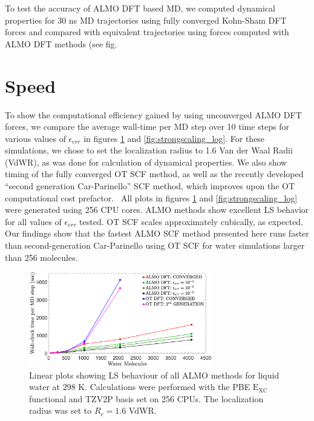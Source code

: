 \documentclass[10pt,aps,prl,twocolumn,amsmath,amssymb,superscriptaddress,longbibliography]{revtex4-1}
\begin{document}
To test the accuracy of ALMO DFT based MD, we computed dynamical properties for 30 ns MD trajectories using fully converged Kohn-Sham DFT forces and compared with equivalent trajectories using forces computed with ALMO DFT methods (see fig. %

\section{Speed}

To show the computational efficiency gained by using unconverged ALMO DFT forces, we compare the average wall-time per MD step over 10 time steps for various values of $\epsilon_{err}$ in figures \ref{fig:strongscaling_linear} and \ref{fig:strongscaling_log}.
For these simulations, we chose to set the localization radius to 1.6 Van der Waal Radii (VdWR), as was done for calculation of dynamical properties.
We also show timing of the fully converged OT SCF method, as well as the recently developed ``second generation Car-Parinello'' SCF method, which improves upon the OT computational cost prefactor.~\cite{a:2ndcpmd}
All plots in figures \ref{fig:strongscaling_linear} and \ref{fig:strongscaling_log} were generated using 256 CPU cores. 
ALMO methods show excellent LS behavior for all values of $\epsilon_{err}$ tested.
OT SCF scales approximately cubically, as expected.
Our findings show that the fastest ALMO SCF method presented here runs faster than second-generation Car-Parinello using OT SCF for water simulations larger than 256 molecules.


\begin{figure}
\includegraphics[trim={1.9cm 0.4cm 3.5cm 1.7cm},clip,width=8cm]{strongscaling_linear.eps}
\caption{\label{fig:strongscaling_linear} Linear plots showing LS behaviour of all ALMO methods for liquid water at 298 K. 
Calculations were performed with the PBE $\mathrm{E_{XC}}$ functional and TZV2P basis set on 256 CPUs. 
The localization radius was set to $R_{c} = 1.6$ VdWR.}
\end{figure}
\end{document}
